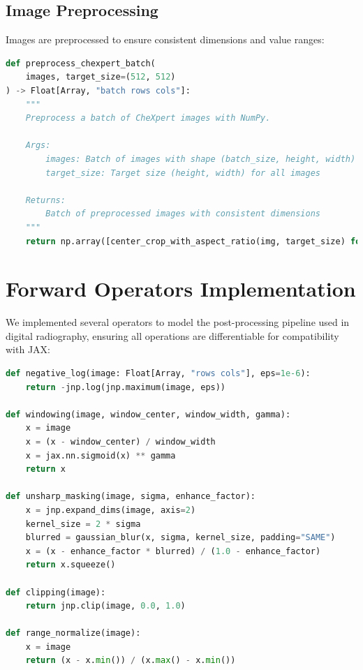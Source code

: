 \documentclass[nomenclature, english, bibtex]{kththesis}
\numberwithin{listing}{chapter}
\begin{document}
\subsection{Image Preprocessing}
Images are preprocessed to ensure consistent dimensions and value ranges:

\begin{lstlisting}[language=Python, caption=Image preprocessing function]
def preprocess_chexpert_batch(
    images, target_size=(512, 512)
) -> Float[Array, "batch rows cols"]:
    """
    Preprocess a batch of CheXpert images with NumPy.

    Args:
        images: Batch of images with shape (batch_size, height, width) or (batch_size, height, width, channels)
        target_size: Target size (height, width) for all images

    Returns:
        Batch of preprocessed images with consistent dimensions
    """
    return np.array([center_crop_with_aspect_ratio(img, target_size) for img in images])
\end{lstlisting}

\section{Forward Operators Implementation}
We implemented several operators to model the post-processing pipeline used in digital radiography, ensuring all operations are differentiable for compatibility with JAX:

\begin{lstlisting}[language=Python, caption=Core forward operators]
def negative_log(image: Float[Array, "rows cols"], eps=1e-6):
    return -jnp.log(jnp.maximum(image, eps))

def windowing(image, window_center, window_width, gamma):
    x = image
    x = (x - window_center) / window_width
    x = jax.nn.sigmoid(x) ** gamma
    return x

def unsharp_masking(image, sigma, enhance_factor):
    x = jnp.expand_dims(image, axis=2)
    kernel_size = 2 * sigma
    blurred = gaussian_blur(x, sigma, kernel_size, padding="SAME")
    x = (x - enhance_factor * blurred) / (1.0 - enhance_factor)
    return x.squeeze()

def clipping(image):
    return jnp.clip(image, 0.0, 1.0)

def range_normalize(image):
    x = image
    return (x - x.min()) / (x.max() - x.min())
\end{lstlisting}
\end{document}

